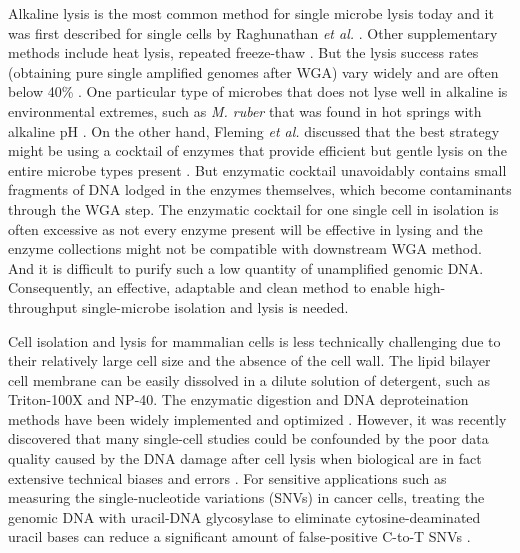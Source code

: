 Alkaline lysis is the most common method for single microbe lysis today and it was first described for single cells by Raghunathan \textit{et al.} \cite{Raghunathan:2005fg}. Other supplementary methods include heat lysis, repeated freeze-thaw \cite{Swan:2011hb,Fleming:2011dv}. But the lysis success rates (obtaining pure single amplified genomes after WGA) vary widely and are often below 40\%  \cite{Stepanauskas:2012ja}. One particular type of microbes that does not lyse well in alkaline is environmental extremes, such as \textit{M. ruber} that was found in hot springs with alkaline pH \cite{NOBRE:1996ke}. On the other hand, Fleming \textit{et al.} discussed that the best strategy might be using a cocktail of enzymes that provide efficient but gentle lysis on the entire microbe types present \cite{Fleming:2011dv}. But enzymatic cocktail unavoidably contains small fragments of DNA lodged in the enzymes themselves, which become contaminants through the WGA step. The enzymatic cocktail for one single cell in isolation is often excessive as not every enzyme present will be effective in lysing and the enzyme collections might not be compatible with downstream WGA method. And it is difficult to purify such a low quantity of unamplified genomic DNA. Consequently, an effective, adaptable and clean method to enable high-throughput single-microbe isolation and lysis is needed. %

Cell isolation and lysis for mammalian cells is less technically challenging due to their relatively large cell size and the absence of the cell wall. The lipid bilayer cell membrane can be easily dissolved in a dilute solution of detergent, such as Triton-100X and NP-40. The enzymatic digestion and DNA deproteination methods have been widely implemented and optimized \cite{Zong:2012bs,Fu:2015gl,Leung:2016vx,Chen:2017hq,Dean:2002us}. However, it was recently discovered that many single-cell studies could be confounded by the poor data quality caused by the DNA damage after cell lysis when biological  are in fact extensive technical biases and errors \cite{Chen:2017hq,Chen:2017dq}. For sensitive applications such as measuring the single-nucleotide variations (SNVs) in cancer cells, treating the genomic DNA with uracil-DNA glycosylase to eliminate cytosine-deaminated uracil bases can reduce a significant amount of false-positive C-to-T SNVs \cite{Chen:2017hq,Rohland:2015uk}. 

